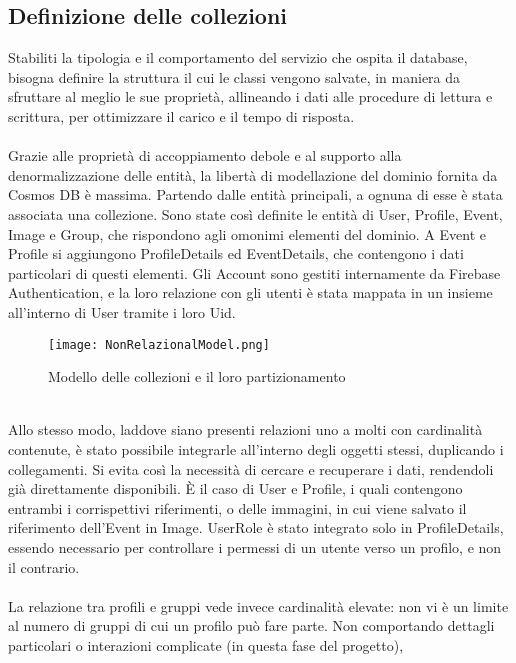 \clearpage

\subsection{Definizione delle collezioni}

Stabiliti la tipologia e il comportamento del servizio che ospita il database,
bisogna definire la struttura il cui le classi vengono salvate,
in maniera da sfruttare al meglio le sue proprietà,
allineando i dati alle procedure di lettura e scrittura,
per ottimizzare il carico e il tempo di risposta.\\
\\
Grazie alle proprietà di accoppiamento debole e al supporto alla denormalizzazione delle entità,
la libertà di modellazione del dominio fornita da Cosmos DB è massima.
Partendo dalle entità principali, a ognuna di esse è stata associata una collezione.
Sono state così definite le entità di User, Profile, Event, Image e Group,
che rispondono agli omonimi elementi del dominio.
A Event e Profile si aggiungono ProfileDetails ed EventDetails,
che contengono i dati particolari di questi elementi.
Gli Account sono gestiti internamente da Firebase Authentication,
e la loro relazione con gli utenti è stata mappata in un insieme all'interno di User
tramite i loro Uid.\\
\begin{figure}[htbp]
    \centering
    \texttt{[image: NonRelazionalModel.png]}
    \caption{Modello delle collezioni e il loro partizionamento}
\end{figure}
\\
Allo stesso modo, laddove siano presenti relazioni uno a molti con cardinalità contenute,
è stato possibile integrarle all'interno degli oggetti stessi, duplicando i collegamenti.
Si evita così la necessità di cercare e recuperare i dati, 
rendendoli già direttamente disponibili.
È il caso di User e Profile, i quali contengono entrambi i corrispettivi riferimenti,
o delle immagini, in cui viene salvato il riferimento dell'Event in Image.
UserRole è stato integrato solo in ProfileDetails,
essendo necessario per controllare i permessi di un utente verso un profilo, e non il contrario.\\
\\
La relazione tra profili e gruppi vede invece cardinalità elevate:
non vi è un limite al numero di gruppi di cui un profilo può fare parte.
Non comportando dettagli particolari o interazioni complicate (in questa fase del progetto),
